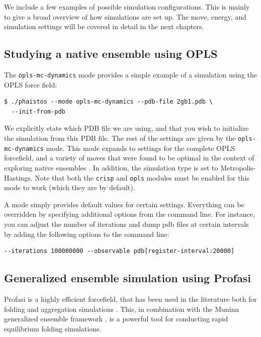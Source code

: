 \documentclass[11pt,a4paper,twoside]{book}
\begin{document}
We include a few examples of possible simulation configurations. This
is mainly to give a broad overview of how simulations are set up. The
move, energy, and simulation settings will be covered in detail in the
next chapters.

\subsection{Studying a native ensemble using OPLS}
\label{sec:study-native-ensembl}

The \texttt{opls-mc-dynamics} mode provides a simple example of a
simulation using the OPLS force field:

\begin{verbatim}
$ ./phaistos --mode opls-mc-dynamics --pdb-file 2gb1.pdb \
  --init-from-pdb
\end{verbatim}

\noindent
We explicitly state which PDB file we are using, and that you wish to
initialize the simulation from this PDB file. The rest of the settings
are given by the \texttt{opls-mc-dynamics} mode. This mode expands to
settings for the complete OPLS forcefield, and a variety of moves that
were found to be optimal in the context of exploring native ensembles
\cite{bottaro2012crisp}. In addition, the simulation type is set to
Metropolis-Hastings. Note that both the \texttt{crisp} and \texttt{opls} modules must be
enabled for this mode to work (which they are by default).

A mode simply provides default values for certain settings. Everything
can be overridden by specifying additional options from the command
line. For instance, you can adjust the number of iterations and dump
pdb files at certain intervals by adding the following options to the
command line:

\begin{verbatim}
--iterations 100000000 --observable pdb[register-interval:20000]
\end{verbatim}


\subsection{Generalized ensemble simulation using Profasi}
 
Profasi is a highly efficient forcefield, that has been used in the
literature both for folding and aggregation simulations
\cite{irback2009effective}. This, in combination with the Muninn
generalized ensemble framework \cite{frellsen12}, is a powerful tool for conducting
rapid equilibrium folding simulations.
\end{document}
